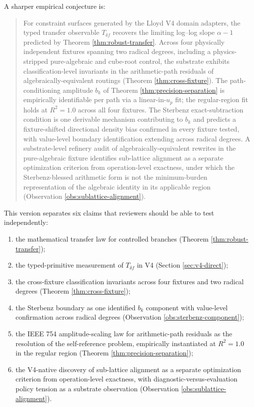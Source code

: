 \documentclass[11pt,a4paper]{article}
\begin{document}
A sharper empirical conjecture is:

\begin{quote}
For constraint surfaces generated by the Lloyd V4 domain adapters, the typed transfer observable $T_{\delta f}$ recovers the limiting log--log slope $\alpha - 1$ predicted by Theorem \ref{thm:robust-transfer}. Across four physically independent fixtures spanning two radical degrees, including a physics-stripped pure-algebraic and cube-root control, the substrate exhibits classification-level invariants in the arithmetic-path residuals of algebraically-equivalent routings (Theorem \ref{thm:cross-fixture}). The path-conditioning amplitude $b_k$ of Theorem \ref{thm:precision-separation} is empirically identifiable per path via a linear-in-$u_p$ fit; the regular-region fit holds at $R^2 = 1.0$ across all four fixtures. The Sterbenz exact-subtraction condition is one derivable mechanism contributing to $b_k$ and predicts a fixture-shifted directional density bias confirmed in every fixture tested, with value-level boundary identification extending across radical degrees. A substrate-level refinery audit of algebraically-equivalent rewrites in the pure-algebraic fixture identifies sub-lattice alignment as a separate optimization criterion from operation-level exactness, under which the Sterbenz-blessed arithmetic form is not the minimum-burden representation of the algebraic identity in its applicable region (Observation \ref{obs:sublattice-alignment}).
\end{quote}

This version separates six claims that reviewers should be able to test independently:
\begin{enumerate}
    \item the mathematical transfer law for controlled branches (Theorem \ref{thm:robust-transfer});
    \item the typed-primitive measurement of $T_{\delta f}$ in V4 (Section \ref{sec:v4-direct});
    \item the cross-fixture classification invariants across four fixtures and two radical degrees (Theorem \ref{thm:cross-fixture});
    \item the Sterbenz boundary as one identified $b_k$ component with value-level confirmation across radical degrees (Observation \ref{obs:sterbenz-component});
    \item the IEEE 754 amplitude-scaling law for arithmetic-path residuals as the resolution of the self-reference problem, empirically instantiated at $R^2 = 1.0$ in the regular region (Theorem \ref{thm:precision-separation});
    \item the V4-native discovery of sub-lattice alignment as a separate optimization criterion from operation-level exactness, with diagnostic-versus-evaluation policy tension as a substrate observation (Observation \ref{obs:sublattice-alignment}).
\end{enumerate}
\end{document}
